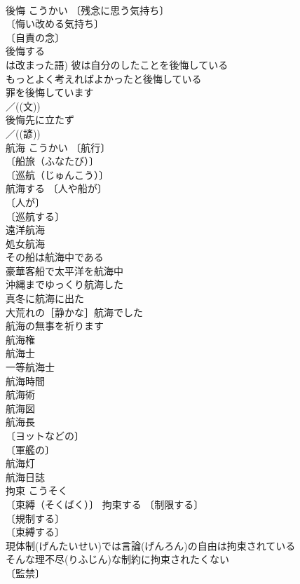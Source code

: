 \documentclass[8pt]{extreport}
\begin{document}
\begin{CJK}{UTF8}{min}
\\	後悔	こうかい	〔残念に思う気持ち〕
\\	〔悔い改める気持ち〕
\\	〔自責の念〕
\\	後悔する 
\\	は改まった語) 彼は自分のしたことを後悔している 
\\	もっとよく考えればよかったと後悔している 
\\	罪を後悔しています 
\\	／((文)) 
\\	後悔先に立たず 
\\	／((諺)) 
\\	航海	こうかい	〔航行〕
\\	〔船旅（ふなたび）〕
\\	〔巡航（じゅんこう）〕
\\	航海する 〔人や船が〕
\\	〔人が〕
\\	〔巡航する〕
\\	遠洋航海 
\\	処女航海 
\\	その船は航海中である 
\\	豪華客船で太平洋を航海中 
\\	沖縄までゆっくり航海した 
\\	真冬に航海に出た 
\\	大荒れの［静かな］航海でした 
\\	航海の無事を祈ります 
\\	航海権 
\\	航海士 
\\	一等航海士 
\\	航海時間 
\\	航海術 
\\	航海図 
\\	航海長 
\\	〔ヨットなどの〕
\\	〔軍艦の〕
\\	航海灯 
\\	航海日誌 
\\	拘束	こうそく	
\\	〔束縛（そくばく）〕 拘束する 〔制限する〕
\\	〔規制する〕
\\	〔束縛する〕
\\	現体制(げんたいせい)では言論(げんろん)の自由は拘束されている 
\\	そんな理不尽(りふじん)な制約に拘束されたくない 
\\	〔監禁〕

\end{CJK}
\end{document}
